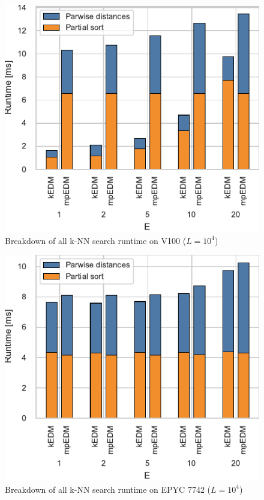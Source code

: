 \documentclass[sigconf]{acmart}
\begin{document}
\begin{figure}
    \centering
    \includegraphics[width=.9\linewidth]{figs/breakdown_knn_v100}
    \caption{Breakdown of all k-NN search runtime on V100 ($L=10^4$)}%
    \label{fig:breakdown-knn-v100}
\end{figure}

\begin{figure}
    \centering
    \includegraphics[width=.9\linewidth]{figs/breakdown_knn_epyc}
    \caption{Breakdown of all k-NN search runtime on EPYC 7742 ($L=10^4$)}%
    \label{fig:breakdown-knn-epyc}
\end{figure}
\end{document}
